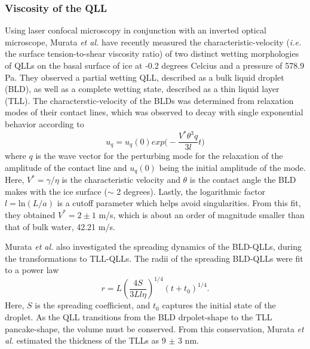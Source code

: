 \subsubsection{Viscosity of the QLL}


Using laser confocal microscopy in conjunction with an inverted
optical microscope, Murata \textit{et al.} have recently measured the
characteristic-velocity (\textit{i.e.} the surface tension-to-shear
viscosity ratio) of two distinct wetting morphologies of QLLs on the
basal surface of ice at -0.2 degrees Celcius and a pressure of 578.9
Pa.\cite{Murata2015} They observed a partial wetting QLL, described as
a bulk liquid droplet (BLD), as well as a complete wetting state,
described as a thin liquid layer (TLL). The characterstic-velocity of
the BLDs was determined from relaxation modes of their contact lines,
which was observed to decay with single exponential behavior according
to
\begin{equation}
u_q = u_q(0) exp\Bigg(-\frac{V^* \theta^3 q}{3l}t\Bigg)
\end{equation}
where $q$ is the wave vector for the perturbing mode for the
relaxation of the amplitude of the contact line and $u_q(0)$ being the
initial amplitude of the mode. Here, $V^* = \gamma / \eta$ is the
characteristic velocity and $\theta$ is the contact angle the BLD makes
with the ice surface ($\sim$ 2 degrees). Lastly, the logarithmic factor
$l=\mathrm{ln}(L/a)$ is a cutoff parameter which helps avoid
singularities. From this fit, they obtained $V^* = 2 \pm 1$ m/s, which
is about an order of magnitude smaller than that of bulk water, 42.21
m/s.

Murata \textit{et al.} also investigated the spreading dynamics of the
BLD-QLLs, during the transformations to TLL-QLLs. The radii of the
spreading BLD-QLLs were fit to a power law
\begin{equation}
r = L (\frac{4S}{3Ll \eta})^{1/4}(t+t_0)^{1/4}.
\end{equation}
Here, $S$ is the spreading coefficient, and $t_0$ captures the initial
state of the droplet. As the QLL transitions from the BLD
drpolet-shape to the TLL pancake-shape, the volume must be
conserved. From this conservation, Murata \textit{et al.} estimated
the thickness of the TLLs as 9 $\pm$ 3 nm.

